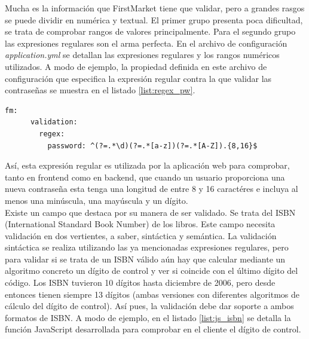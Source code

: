 \documentclass[a4paper]{article}
\begin{document}
    Mucha es la información que FirstMarket tiene que validar, pero a grandes rasgos se puede dividir en numérica y textual. El primer grupo presenta poca dificultad, se trata de comprobar rangos de valores principalmente. Para el segundo grupo las expresiones regulares son el arma perfecta. En el archivo de configuración \emph{application.yml} se detallan las expresiones regulares y los rangos numéricos utilizados. A modo de ejemplo, la propiedad definida en este archivo de configuración que especifica la expresión regular contra la que validar las contraseñas se muestra en el listado \ref{list:regex_pw}.
    \\
     
    \begin{lstlisting}[caption=Expresión regular para las contraseñas,label=list:regex_pw]
    fm:
      validation:
        regex:
          password: ^(?=.*\d)(?=.*[a-z])(?=.*[A-Z]).{8,16}$
    \end{lstlisting}
    
    Así, esta expresión regular es utilizada por la aplicación web para comprobar, tanto en frontend como en backend, que cuando un usuario proporciona una nueva contraseña esta tenga una longitud de entre 8 y 16 caractéres e incluya al menos una minúscula, una mayúscula y un dígito.
    \\
    
    Existe un campo que destaca por su manera de ser validado. Se trata del ISBN (International Standard Book Number) de los libros. Este campo necesita validación en dos vertientes, a saber, sintáctica y semántica. La validación sintáctica se realiza utilizando las ya mencionadas expresiones regulares, pero para validar si se trata de un ISBN válido aún hay que calcular mediante un algoritmo concreto un dígito de control y ver si coincide con el último dígito del código. Los ISBN tuvieron 10 dígitos hasta diciembre de 2006, pero desde entonces tienen siempre 13 dígitos (ambas versiones con diferentes algoritmos de cálculo del dígito de control). Así pues, la validación debe dar soporte a ambos formatos de ISBN. A modo de ejemplo, en el listado \ref{list:js_isbn} se detalla la función JavaScript desarrollada para comprobar en el cliente el dígito de control.
    \\
    
\end{document}
